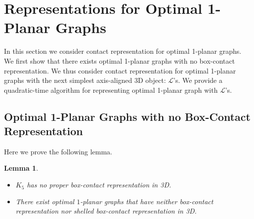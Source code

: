 \documentclass{article}
\newtheorem{lemma}[theorem]{Lemma}
\newcommand{\LLs}{$\mathcal{L}$'s\xspace}
\begin{document}
\section{Representations for Optimal 1-Planar Graphs}

In this section we consider contact representation for optimal 1-planar graphs. We first show that
 there exists optimal 1-planar graphs with no box-contact representation. We thus consider contact
 representation for optimal 1-planar graphs with the next simplest axis-aligned 3D object: \LLs.
 We provide a quadratic-time algorithm for representing optimal 1-planar graph with \LLs.



\subsection{Optimal 1-Planar Graphs with no Box-Contact Representation}

Here we prove the following lemma.

\begin{lemma}
\label{lem:K5}{\ \\[-1em]}
 \begin{itemize}
  \item $K_5$ has no proper box-contact representation in 3D.
  \item  There exist optimal $1$-planar graphs that have neither box-contact representation nor shelled
 box-contact representation in 3D.
 \end{itemize}
 \end{lemma}
\end{document}
